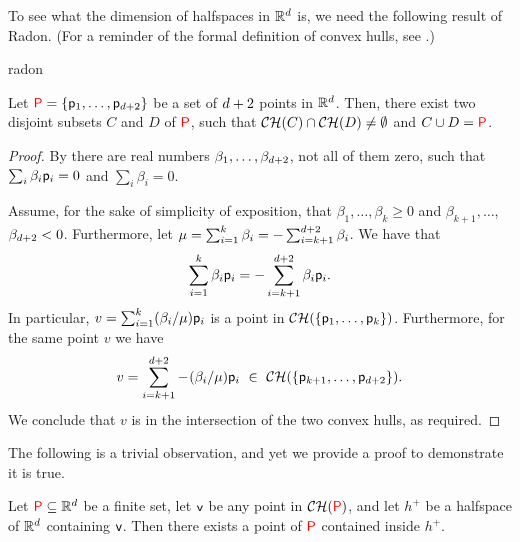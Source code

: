 To see what the \VC dimension of halfspaces in $\mathbb{R}^d$ is, we need
the following result of Radon. (For a reminder of the formal
definition of convex hulls, see .)

\begin{fragment}{radon}
\begin{theorem}
    Let ${{\textcolor{red}{\mathsf{P}}}} = \left\{ {\mathsf{p}_1, \ldots, \mathsf{p}_{d+2}} \right\}$ be a set of
    $d+2$ points in $\mathbb{R}^d$. Then, there exist two disjoint
    subsets $C$ and $D$ of ${{\textcolor{red}{\mathsf{P}}}}$, such that $\CHX{C} \cap \CHX{D}
    \ne \emptyset$ and $C \cup D = {{\textcolor{red}{\mathsf{P}}}}$. %
\end{theorem}
\end{fragment}
\begin{proof}
    By  there are real numbers $\beta_1, \ldots,
    \beta_{d+2}$, not all of them zero, such that $\sum_i \beta_i
    \mathsf{p}_i = 0$ and $\sum_i \beta_i = 0$.
    
    Assume, for the sake of simplicity of exposition, that $\beta_1, 
    \ldots, \beta_k \geq 0$ and $\beta_{k+1}, \ldots$,
    $\beta_{d+2} < 0$.  Furthermore, let $\mu = \sum_{i=1}^{k}
    \beta_i = -\sum_{i=k+1}^{d+2} \beta_i$.  We have that
    \begin{equation*}
        \sum_{i=1}^{k} \beta_i \mathsf{p}_i = - \sum_{i=k+1}^{d+2} \beta_i
        \mathsf{p}_i.        
    \end{equation*}
    In particular, $v = \sum_{i=1}^{k} (\beta_i/\mu) \mathsf{p}_i$ is a
    point in $\CHX{\brc{\pnt_1,\ldots, \pnt_k}}$. Furthermore, for the
    same point $v$ we have    
    \begin{equation*}
        v = \sum_{i=k+1}^{\hdim+2} - \ts(\beta_i/\mu) \pnt_i
        \,\,\in\,\,%
        \CHX{\brc{\pnt_{k+1}, \ldots, \pnt_{\hdim+2}}}.
    \end{equation*}
     We conclude that
    $v$ is in the intersection of the two convex hulls, as required.
\end{proof}


The following is a trivial observation, and yet we provide a proof to
demonstrate it is true.

\begin{lemma}
    Let ${{\textcolor{red}{\mathsf{P}}}} \subseteq \mathbb{R}^d$ be a finite set, let $\mathsf{v}$ be
    any point in $\CHX{\PntSet}$, and let $h^+$ be a halfspace of
    $\mathbb{R}^d$ containing $\mathsf{v}$. Then there exists a point of
    ${{\textcolor{red}{\mathsf{P}}}}$ contained inside $h^+$.
\end{lemma}

